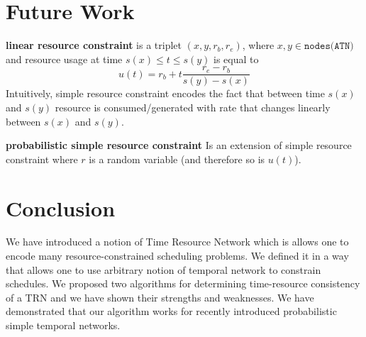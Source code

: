 \documentclass{article}
\begin{document}
\section{Future Work}
\textbf{linear resource constraint} is a triplet $(x, y, r_b, r_e)$, where $x, y \in \texttt{nodes(ATN)}$ and resource usage at time $s(x) \leq t \leq s(y)$ is equal to
\[
    u(t) = r_b + t  \frac{r_e - r_b}{s(y) - s(x)}
\]
Intuitively, simple resource constraint encodes the fact that between time $s(x)$ and $s(y)$  resource is consumed/generated with rate that changes linearly between $s(x)$ and $s(y)$.

\textbf{probabilistic simple resource constraint}
Is an extension of simple resource constraint where $r$ is a random variable (and therefore so is $u(t)$).




\section{Conclusion}
We have introduced a notion of Time Resource Network which is allows one to encode many resource-constrained scheduling problems. We defined it in a way that allows one to use arbitrary notion of temporal network to constrain schedules. We proposed two algorithms for determining time-resource consistency of a TRN and we have shown their strengths and weaknesses. We have demonstrated that our algorithm works for recently introduced probabilistic simple temporal networks.





\end{document}
